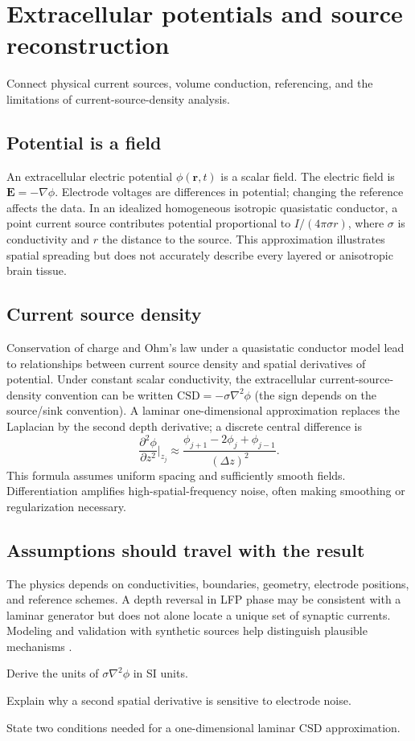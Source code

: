 \chapter{Extracellular potentials and source reconstruction}\label{ch:biophysics}
\begin{readergoal}Connect physical current sources, volume conduction, referencing, and the limitations of current-source-density analysis.\end{readergoal}
\section{Potential is a field}
An extracellular electric potential $\phi(\mathbf r,t)$ is a scalar field. The electric field is $\mathbf E=-\nabla\phi$. Electrode voltages are differences in potential; changing the reference affects the data. In an idealized homogeneous isotropic quasistatic conductor, a point current source contributes potential proportional to $I/(4\pi\sigma r)$, where $\sigma$ is conductivity and $r$ the distance to the source. This approximation illustrates spatial spreading but does not accurately describe every layered or anisotropic brain tissue.

\section{Current source density}
Conservation of charge and Ohm's law under a quasistatic conductor model lead to relationships between current source density and spatial derivatives of potential. Under constant scalar conductivity, the extracellular current-source-density convention can be written $\mathrm{CSD}=-\sigma\nabla^2\phi$ (the sign depends on the source/sink convention). A laminar one-dimensional approximation replaces the Laplacian by the second depth derivative; a discrete central difference is
\[\frac{\partial^2\phi}{\partial z^2}\Big|_{z_j}\approx\frac{\phi_{j+1}-2\phi_j+\phi_{j-1}}{(\Delta z)^2}.\]
This formula assumes uniform spacing and sufficiently smooth fields. Differentiation amplifies high-spatial-frequency noise, often making smoothing or regularization necessary.

\section{Assumptions should travel with the result}
The physics depends on conductivities, boundaries, geometry, electrode positions, and reference schemes. A depth reversal in LFP phase may be consistent with a laminar generator but does not alone locate a unique set of synaptic currents. Modeling and validation with synthetic sources help distinguish plausible mechanisms \cite{Buzsaki2012,Einevoll2013}.

\begin{exercises}
\item Derive the units of $\sigma\nabla^2\phi$ in SI units.
\item Explain why a second spatial derivative is sensitive to electrode noise.
\item State two conditions needed for a one-dimensional laminar CSD approximation.
\end{exercises}